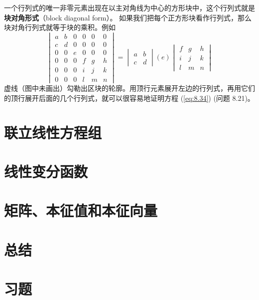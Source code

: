     一个行列式的唯一非零元素出现在以主对角线为中心的方形块中，这个行列式就是\textbf{块对角形式}（block diagonal form）。 如果我们把每个正方形块看作行列式，那么块对角行列式就等于块的乘积。例如
    \begin{equation}
        \begin{vmatrix}
            a & b & 0 & 0 & 0 & 0 \\
            c & d & 0 & 0 & 0 & 0 \\
            0 & 0 & e & 0 & 0 & 0 \\
            0 & 0 & 0 & f & g & h \\
            0 & 0 & 0 & i & j & k \\
            0 & 0 & 0 & l & m & n
        \end{vmatrix} = \begin{vmatrix}
            a & b \\
            c & d
        \end{vmatrix} \left(e\right)\begin{vmatrix}
            f & g & h \\
            i & j & k \\
            l & m & n
        \end{vmatrix}
        \label{eq:8.34}
    \end{equation}
    虚线（图中未画出）勾勒出区块的轮廓。用顶行元素展开左边的行列式，再用它们的顶行展开后面的几个行列式，就可以很容易地证明方程 (\ref{eq:8.34}) (问题 8.21)。

\section{联立线性方程组}
\label{sec:8.4 Simultaneous Linear Equations}

















\section{线性变分函数}
\label{sec:8.5 Linear Variational Functions}

\section{矩阵、本征值和本征向量}
\label{sec:8.6 Matrices, Eigenvalues, and Eigenvectors}

\section*{总结}

\section*{习题}